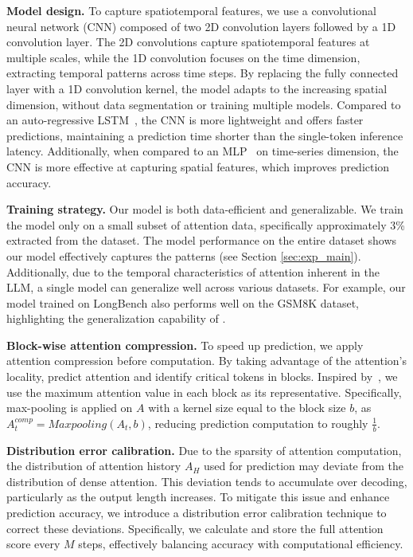 \textbf{Model design.} To capture spatiotemporal features, we use a convolutional neural network (CNN) composed of two 2D convolution layers followed by a 1D convolution layer. 
The 2D convolutions capture spatiotemporal features at multiple scales, while the 1D convolution focuses on the time dimension, extracting temporal patterns across time steps. By replacing the fully connected layer with a 1D convolution kernel, the model adapts to the increasing spatial dimension, without data segmentation or training multiple models.
Compared to an auto-regressive LSTM~\citep{graves2012lstm}, the CNN is more lightweight and offers faster predictions, maintaining a prediction time shorter than the single-token inference latency. Additionally, when compared to an MLP~\citep{rumelhart1986MLP} on time-series dimension, the CNN is more effective at capturing spatial features, which improves prediction accuracy. 


\textbf{Training strategy.} Our model is both data-efficient and generalizable.
We train the model only on a small subset of attention data, specifically approximately 3\% extracted from the dataset. The model performance on the entire dataset shows our model effectively captures the patterns (see Section \ref{sec:exp_main}). 
Additionally, due to the temporal characteristics of attention inherent in the LLM, a single model can generalize well across various datasets. For example, our model trained on LongBench also performs well on the GSM8K dataset, highlighting the generalization capability of \ours.



\textbf{Block-wise attention compression.}
To speed up prediction, we apply attention compression before computation. 
By taking advantage of the
attention's locality,
\ours predict attention and identify critical tokens in blocks. Inspired by~\citet{tang2024quest}, we use the maximum attention value in each block as its representative.
Specifically, max-pooling is applied on $A$ with a kernel size equal to the block size $b$, as $A_t^{comp} = Maxpooling(A_t,b)$, reducing prediction computation to roughly $\frac{1}{b}$. 

\textbf{Distribution error calibration.}
Due to the sparsity of attention computation, the distribution of attention history $A_H$ used for prediction may deviate from the distribution of dense attention. This deviation tends to accumulate over decoding, particularly as the output length increases. To mitigate this issue and enhance prediction accuracy, we introduce a distribution error calibration technique to correct these deviations. Specifically, we calculate and store the full attention score every $M$ steps, effectively balancing accuracy with computational efficiency.

